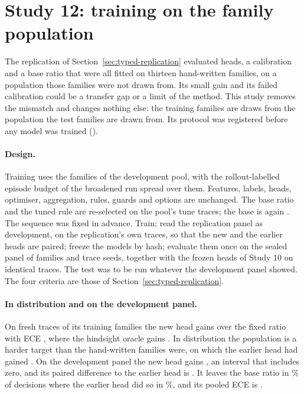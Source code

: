 \documentclass[10pt]{article}
\begin{document}
\section{Study 12: training on the family population}
\label{sec:typed-population}
The replication of Section~\ref{sec:typed-replication} evaluated heads, a calibration and a base ratio that were all fitted on thirteen hand-written families, on a population those families were not drawn from. Its small gain and its failed calibration could be a transfer gap or a limit of the method. This study removes the mismatch and changes nothing else: the training families are draws from the population the test families are drawn from. Its protocol was registered before any model was trained ().

\paragraph{Design.}
Training uses the \TypedRepPoolFamilies{} families of the development pool, with the rollout-labelled episode budget of the broadened run spread over them. Features, labels, heads, optimiser, aggregation, rules, guards and options are unchanged. The base ratio and the tuned rule are re-selected on the pool's tune traces; the base is again \TypedPopBaseRatio{}. The sequence was fixed in advance. Train; read the replication panel as development, on the replication's own traces, so that the new and the earlier heads are paired; freeze the models by hash; evaluate them once on the sealed panel of \TypedPopFamilies{} families and \TypedPopTraceSeeds{} trace seeds, together with the frozen heads of Study 10 on identical traces. The test was to be run whatever the development panel showed. The four criteria are those of Section~\ref{sec:typed-replication}.

\paragraph{In distribution and on the development panel.}
On fresh traces of its \TypedPopValFamilies{} training families the new head gains \TypedPopValGain{} \TypedPopValGainT{} over the fixed ratio with ECE \TypedPopValEce{}, where the hindsight oracle gains \TypedPopValOracleGain{}. In distribution the population is a harder target than the hand-written families were, on which the earlier head had gained \TypedBroadValBayesVsBase{}. On the development panel the new head gains \TypedPopDevGain{} \TypedPopDevGainT{}, an interval that includes zero, and its paired difference to the earlier head is \TypedPopDevVsReference{} \TypedPopDevVsReferenceT{}. It leaves the base ratio in \TypedPopDevOverride\% of decisions where the earlier head did so in \TypedRepOverride\%, and its pooled ECE is \TypedPopDevEce{}.
\end{document}
